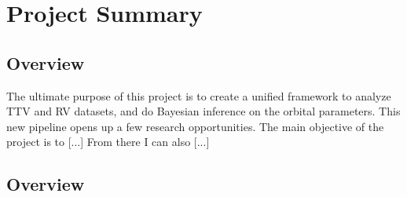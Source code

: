 \section{Project Summary}
\subsection{Overview}
The ultimate purpose of this project is to create a unified framework to analyze TTV and RV datasets, and do Bayesian inference on the orbital parameters.
This new pipeline opens up a few research opportunities.
The main objective of the project is to [...]
From there I can also [...]

\subsection{Overview} 
